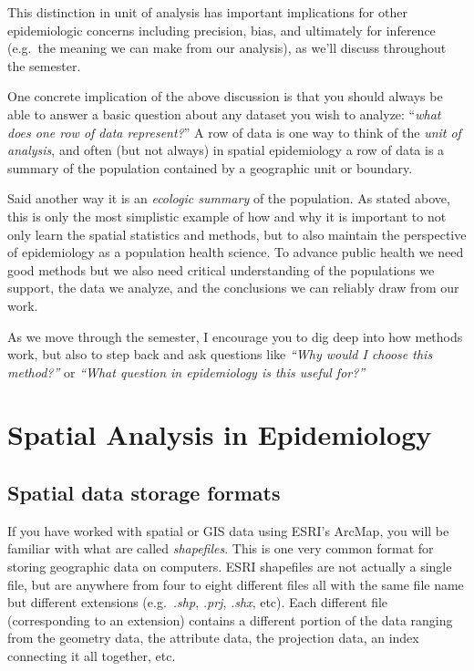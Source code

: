 \documentclass[
]{book}
\begin{document}
This distinction in unit of analysis has important implications for other epidemiologic concerns including precision, bias, and ultimately for inference (e.g.~the meaning we can make from our analysis), as we'll discuss throughout the semester.

One concrete implication of the above discussion is that you should always be able to answer a basic question about any dataset you wish to analyze: ``\emph{what does one row of data represent?}'' A row of data is one way to think of the \emph{unit of analysis}, and often (but not always) in spatial epidemiology a row of data is a summary of the population contained by a geographic unit or boundary.

Said another way it is an \emph{ecologic summary} of the population. As stated above, this is only the most simplistic example of how and why it is important to not only learn the spatial statistics and methods, but to also maintain the perspective of epidemiology as a population health science. To advance public health we need good methods but we also need critical understanding of the populations we support, the data we analyze, and the conclusions we can reliably draw from our work.

As we move through the semester, I encourage you to dig deep into how methods work, but also to step back and ask questions like \emph{``Why would I choose this method?''} or \emph{``What question in epidemiology is this useful for?''}

\hypertarget{spatial-analysis-in-epidemiology}{%
\section{Spatial Analysis in Epidemiology}\label{spatial-analysis-in-epidemiology}}

\hypertarget{spatial-data-storage-formats}{%
\subsection{Spatial data storage formats}\label{spatial-data-storage-formats}}

If you have worked with spatial or GIS data using ESRI's ArcMap, you will be familiar with what are called \emph{shapefiles}. This is one very common format for storing geographic data on computers. ESRI shapefiles are not actually a single file, but are anywhere from four to eight different files all with the same file name but different extensions (e.g.~\emph{.shp}, \emph{.prj}, \emph{.shx}, etc). Each different file (corresponding to an extension) contains a different portion of the data ranging from the geometry data, the attribute data, the projection data, an index connecting it all together, etc.
\end{document}
